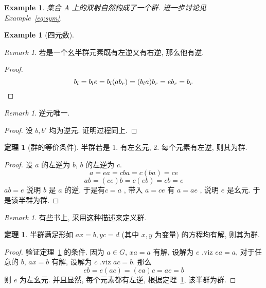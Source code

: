 \documentclass[12pt]{ctexart}
\theoremstyle{definition}
\theoremstyle{definition}
\newtheorem{thm}[definition]{定理}
\theoremstyle{plain}
\newtheorem{exam}[definition]{Example}
\theoremstyle{remark}
\newtheorem{remark}[definition]{Remark}
\begin{document}
\begin{exam}
	集合 \(A\) 上的双射自然构成了一个群. 进一步讨论见 Example~\ref{eg:sym}.
\end{exam}

\begin{exam}[四元数] \label{eg:四元数}
\end{exam}

\begin{remark}
若是一个幺半群元素既有左逆又有右逆, 那么他有逆.
\end{remark}
\begin{proof}
\begin{equation*}
b_{l} = b_{l} e = b_{l} (a b_{r}) = (b_{l} a) b_{r} = e b_{r} = b_{r}\qedhere
\end{equation*}
\end{proof}
\begin{remark}
逆元唯一.  
\end{remark}
\begin{proof}
设 \(b, b'\) 均为逆元. 证明过程同上.
\end{proof}

\begin{thm}[群的等价条件]\label{thm:dengjia}
半群若是 1. 有左幺元, 2. 每个元素有左逆, 则其为群.
\end{thm}
\begin{proof}
设 \(a\) 的左逆为 \(b\), \(b\) 的左逆为 \(c\). 
\begin{equation}
a = ea = c b a  = c ( ba) = c e
\end{equation}
\begin{equation}
ab =  (ce) b = c(eb) =  cb  = e 
\end{equation}
\(ab  = e\) 说明 \(b\) 是 \(a \) 的逆. 于是有\(c = a\) , 带入 \(a = ce\) 有 \(a =  a e \) , 说明 \(e\) 是幺元. 于是该半群为群.
\end{proof}
\begin{remark}
有些书上, 采用这种描述来定义群.
\end{remark}

\begin{thm}
半群满足形如 \(a x = b , y c = d\)  (其中 \(x, y\) 为变量) 的方程均有解, 则其为群.
\end{thm}
\begin{proof}
	验证定理~\ref{thm:dengjia} 的条件. 因为
	\(a \in G \), \(x a = a\)  有解, 设解为 \(e\) .viz \(e a = a\), 对于任意的 \(b\), \(a x = b\) 有解, 设解为 \(c\) .viz \(a c =b\). 
	那么
	\begin{equation}
	e b = e (ac ) = (e a) c = ac = b 
	\end{equation}
	则 \(e\) 为左幺元. 并且显然, 每个元素都有左逆, 根据定理~\ref{thm:dengjia}, 该半群为群.
\end{proof}
\end{document}
